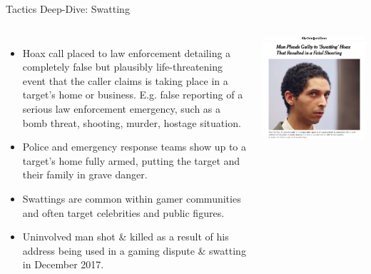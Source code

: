 \documentclass[nobackground,dvipsnames,table]{beamer}
\begin{document}
\begin{frame}{Tactics Deep-Dive: Swatting}
    \begin{columns}
            \scriptsize
            \begin{itemize}
                \item Hoax call placed to law enforcement detailing a completely false but plausibly life-threatening event that the caller claims is taking place in a target’s home or business. E.g. false reporting of a serious law enforcement emergency, such as a bomb threat, shooting, murder, hostage situation.
                \item Police and emergency response teams show up to a target’s home fully armed, putting the target and their family in grave danger.
                \item Swattings are common within gamer communities and often target celebrities and public figures.
                \item Uninvolved man shot \& killed as a result of his address being used in a gaming dispute \& swatting in December 2017.
            \end{itemize}
            \includegraphics[width=\textwidth]{swatting-nyt}
    \end{columns}
\end{frame}
\end{document}
